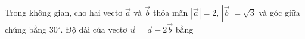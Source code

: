 \begin{ex}
Trong không gian, cho hai vectơ $\vec{a}$ và $\vec{b}$ thỏa mãn $|\vec{a}|=2$, $|\vec{b}|=\sqrt3$ và góc giữa chúng bằng $30^\circ$. Độ dài của vectơ $\vec{u}=\vec{a}-2\vec{b}$ bằng
\end{ex}
